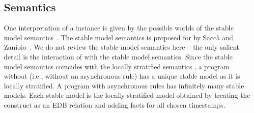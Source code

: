 



\subsection{Semantics}
One interpretation of a \lang instance is given by the possible worlds of the
stable model semantics~\cite{stable-model}.  The stable model semantics is proposed for  by Sacc\`{a} and Zaniolo~\cite{sacca-zaniolo}.
We do not review the stable model
semantics here -- the only salient detail is the interaction of 
with the stable model semantics.  Since the stable model semantics coincides with the locally stratified semantics , a \lang program without  (i.e., without an asynchronous rule) has a unique stable model as it is locally stratified.  A \lang program with asynchronous rules has infinitely many stable models.  Each stable model is the locally stratified model obtained by treating the  construct as an EDB relation and adding facts for all chosen timestamps.

